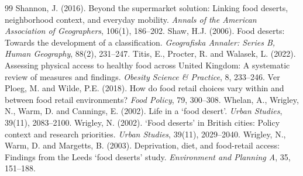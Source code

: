 \documentclass[11pt,a4paper]{article}
\begin{document}
\begin{thebibliography}{99}
 Shannon, J. (2016). Beyond the supermarket solution: Linking food deserts, neighborhood context, and everyday mobility. \emph{Annals of the American Association of Geographers}, 106(1), 186--202.
 Shaw, H.J. (2006). Food deserts: Towards the development of a classification. \emph{Geografiska Annaler: Series B, Human Geography}, 88(2), 231--247.
 Titis, E., Procter, R. and Walasek, L. (2022). Assessing physical access to healthy food across United Kingdom: A systematic review of measures and findings. \emph{Obesity Science \& Practice}, 8, 233--246.
 Ver Ploeg, M. and Wilde, P.E. (2018). How do food retail choices vary within and between food retail environments? \emph{Food Policy}, 79, 300--308.
 Whelan, A., Wrigley, N., Warm, D. and Cannings, E. (2002). Life in a `food desert'. \emph{Urban Studies}, 39(11), 2083--2100.
 Wrigley, N. (2002). `Food deserts' in British cities: Policy context and research priorities. \emph{Urban Studies}, 39(11), 2029--2040.
 Wrigley, N., Warm, D. and Margetts, B. (2003). Deprivation, diet, and food-retail access: Findings from the Leeds `food deserts' study. \emph{Environment and Planning A}, 35, 151--188.
\end{thebibliography}
\end{document}
